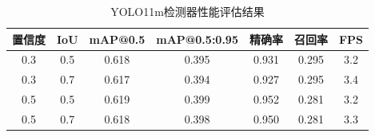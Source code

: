 
\begin{table}[h!]
\centering
\caption{YOLO11m检测器性能评估结果}
\begin{tabular}{|c|c|c|c|c|c|c|}
\hline
\textbf{置信度} & \textbf{IoU} & \textbf{mAP@0.5} & \textbf{mAP@0.5:0.95} & \textbf{精确率} & \textbf{召回率} & \textbf{FPS} \\
\hline
0.3 & 0.5 & 0.618 & 0.395 & 0.931 & 0.295 & 3.2 \\
0.3 & 0.7 & 0.617 & 0.394 & 0.927 & 0.295 & 3.4 \\
0.5 & 0.5 & 0.619 & 0.399 & 0.952 & 0.281 & 3.2 \\
0.5 & 0.7 & 0.618 & 0.398 & 0.950 & 0.281 & 3.3 \\
\hline
\end{tabular}
\label{tab:yolo_performance}
\end{table}
